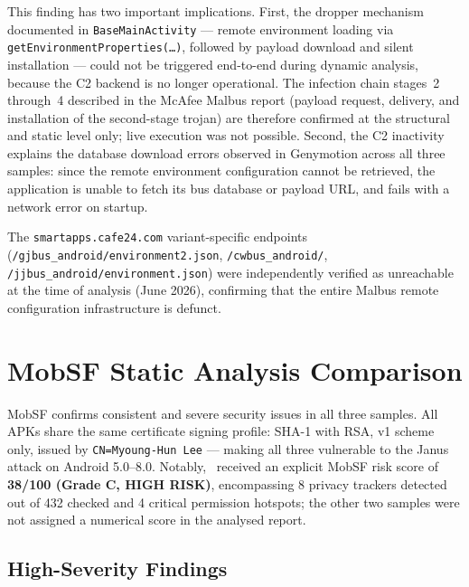 This finding has two important implications.
First, the dropper mechanism documented in \texttt{BaseMainActivity} --- remote environment loading via \texttt{getEnvironmentProperties(\ldots)}, followed by payload download and silent installation --- could not be triggered end-to-end during dynamic analysis, because the C2 backend is no longer operational.
The infection chain stages~2 through~4 described in the McAfee Malbus report (payload request, delivery, and installation of the second-stage trojan) are therefore confirmed at the structural and static level only; live execution was not possible.
Second, the C2 inactivity explains the database download errors observed in Genymotion across all three samples: since the remote environment configuration cannot be retrieved, the application is unable to fetch its bus database or payload URL, and fails with a network error on startup.

The \texttt{smartapps.cafe24.com} variant-specific endpoints (\texttt{/gjbus\_android/environment2.json}, \texttt{/cwbus\_android/}, \texttt{/jjbus\_android/environment.json}) were independently verified as unreachable at the time of analysis (June 2026), confirming that the entire Malbus remote configuration infrastructure is defunct.

\section{MobSF Static Analysis Comparison}

MobSF confirms consistent and severe security issues in all three samples.
All APKs share the same certificate signing profile: SHA-1 with RSA, v1 scheme only, issued by \texttt{CN=Myoung-Hun Lee} --- making all three vulnerable to the Janus attack on Android 5.0--8.0.
Notably, \threer \  received an explicit MobSF risk score of \textbf{38/100 (Grade C, HIGH RISK)}, encompassing 8 privacy trackers detected out of 432 checked and 4 critical permission hotspots; the other two samples were not assigned a numerical score in the analysed report.

\subsection{High-Severity Findings}

